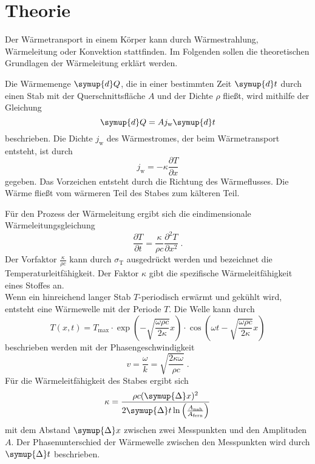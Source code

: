 \section{Theorie} \label{sec:theorie}

    Der Wärmetransport in einem Körper kann durch Wärmestrahlung, Wärmeleitung oder Konvektion
    stattfinden.
    Im Folgenden sollen die theoretischen Grundlagen der Wärmeleitung erklärt werden.


    Die Wärmemenge $\symup{d}Q$, die in einer bestimmten Zeit $\symup{d}t$ durch einen Stab mit der
    Querschnittsfläche $A$ und der Dichte $\rho$ fließt, wird mithilfe der Gleichung
    \begin{equation}
      \label{eqn:waermemenge_pro_zeit}
      \symup{d}Q =  A j_\text{w} \symup{d}t
    \end{equation}
    beschrieben.
    Die Dichte $j_\text{w}$ des Wärmestromes, der beim Wärmetransport entsteht, ist durch
    \begin{equation}
      \label{eqn:waermestromdichte}
        j_\text{w} = - \kappa \frac{\partial T}{\partial x}
    \end{equation}
    gegeben.
    Das Vorzeichen entsteht durch die Richtung des Wärmeflusses.
    Die Wärme fließt vom wärmeren Teil des Stabes zum kälteren Teil.


    Für den Prozess der Wärmeleitung ergibt sich die eindimensionale Wärmeleitungsgleichung
    \begin{equation*}
        \frac{\partial T}{\partial t} = \frac{\kappa}{\rho c} \frac{\partial^2 T}{\partial x^2} \; .
    \end{equation*}
    Der Vorfaktor $\frac{\kappa}{\rho c}$ kann durch $\sigma_\text{T}$ ausgedrückt werden
    und bezeichnet die Temperaturleitfähigkeit.
    Der Faktor $\kappa$ gibt die spezifische Wärmeleitfähigkeit eines Stoffes an. \\


    Wenn ein hinreichend langer Stab $T$-periodisch erwärmt und gekühlt wird,
    entsteht eine Wärmewelle mit der Periode $T$.
    Die Welle kann durch
    \begin{equation*}
        T(x,t) = T_\text{max} \cdot \exp{\left( - \sqrt{\frac{\omega \rho c}{2\kappa}} x \right)}
        \cdot \cos \left( \omega t - \sqrt{\frac{\omega \rho c}{2 \kappa}} x \right)
    \end{equation*}
    beschrieben werden mit der Phasengeschwindigkeit
    \begin{equation}
      \label{eqn:phasengeschwindigkeit}
        v = \frac{\omega}{k} = \sqrt{\frac{2 \kappa \omega}{\rho c}} \; .
    \end{equation}
    Für die Wärmeleitfähigkeit des Stabes ergibt sich
    \begin{equation}
      \label{eqn:waermeleitfaehigkeit}
        \kappa = \frac{\rho c (\symup{\Delta}x)^2}{2 \symup{\Delta}t \ln \left( \frac{A_\text{nah}}{A_\text{fern}} \right)}
    \end{equation}
    mit dem Abstand $\symup{\Delta}x$ zwischen zwei Messpunkten und den Amplituden $A$.
    Der Phasenunterschied der Wärmewelle zwischen den Messpunkten wird durch $\symup{\Delta} t$ beschrieben.

